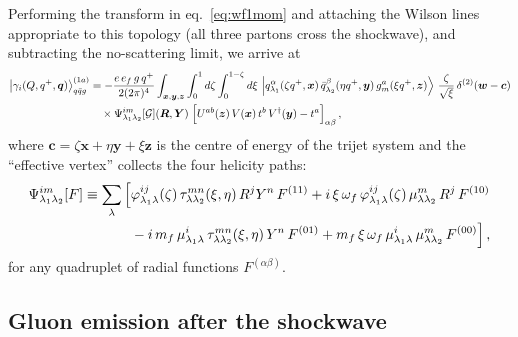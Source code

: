 \documentclass[11pt,a4paper]{article}
\newcommand{\ket}[1]{\left|#1\right\rangle}
\newcommand{\calG}{\mathcal{G}}
\newcommand{\vx}{\bm{x}}
\newcommand{\vy}{\bm{y}}
\newcommand{\vz}{\bm{z}}
\newcommand{\vw}{\bm{w}}
\newcommand{\vc}{\bm{c}}
\newcommand{\vR}{\bm{R}}
\newcommand{\vY}{\bm{Y}}
\newcommand{\vq}{\bm{q}}
\numberwithin{equation}{section}
\begin{document}
Performing the transform in eq.~\eqref{eq:wf1mom} and attaching the Wilson lines appropriate to
this topology (all three partons cross the shockwave), and subtracting the no-scattering limit,
we arrive at
\begin{align}
\label{eq:wf1}
\ket{\gamma_{i}(Q,q^{+},\vq)}^{(1a)}_{q\bar{q}g} &= -\frac{e\,e_{f}\,g\,q^{+}}{2(2\pi)^{4}}
\int_{\vx,\vy,\vz} \int_{0}^{1} d\zeta \int_{0}^{1-\zeta} d\xi\,
\ket{q^{\alpha}_{\lambda_{1}}(\zeta q^{+},\vx)\,\bar{q}^{\beta}_{\lambda_{2}}(\eta q^{+},\vy)\,
g^{a}_{m}(\xi q^{+},\vz)}\, \frac{\zeta}{\sqrt{\xi}}\, \delta^{(2)}(\vw-\vc) \notag\\
&\quad\times \Psi^{im}_{\lambda_{1}\lambda_{2}}[\calG](\vR,\vY)\;
\Big[U^{ab}(\vz)\,V(\vx)\,t^{b}\,V^{\dagger}(\vy)-t^{a}\Big]_{\alpha\beta}\,,
\end{align}
where $\vc = \zeta\vx +\eta\vy + \xi\vz$ is the centre of energy of the trijet system and the
``effective vertex'' collects the four helicity paths:
\begin{align}
\label{eq:Psidef}
\Psi^{im}_{\lambda_{1}\lambda_{2}}[F] \equiv \sum_{\lambda}
\Big[&\varphi^{ij}_{\lambda_{1}\lambda}(\zeta)\,\tau^{mn}_{\lambda\lambda_{2}}(\xi,\eta)\,
R^{j}Y^{n}\,F^{(11)}
+i\,\xi\,\omega_{f}\,\varphi^{ij}_{\lambda_{1}\lambda}(\zeta)\,\mu^{m}_{\lambda\lambda_{2}}\,
R^{j}\,F^{(10)} \notag\\
&-i\,m_{f}\,\mu^{i}_{\lambda_{1}\lambda}\,\tau^{mn}_{\lambda\lambda_{2}}(\xi,\eta)\,
Y^{n}\,F^{(01)} + m_{f}\,\xi\,\omega_{f}\,
\mu^{i}_{\lambda_{1}\lambda}\,\mu^{m}_{\lambda\lambda_{2}}\,F^{(00)}\Big]\,,
\end{align}
for any quadruplet of radial functions $F^{(\alpha\beta)}$.

\subsection{Gluon emission after the shockwave}
\label{sec:afterSW}
\end{document}
